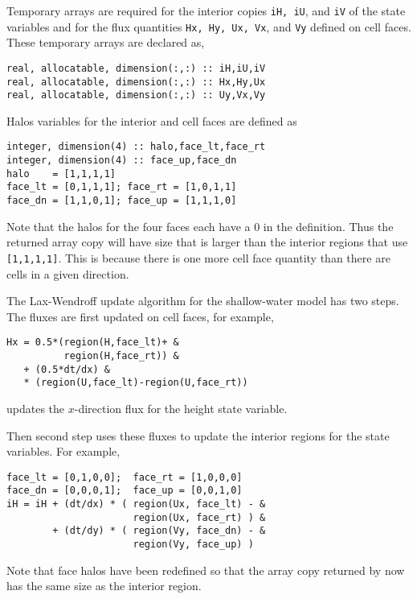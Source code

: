 Temporary arrays are required for the interior copies {\tt iH, iU}, and
{\tt iV} of the state variables and for the flux quantities {\tt Hx, Hy, Ux,
Vx}, and {\tt Vy} defined on cell faces.  These temporary arrays are declared as,

{\small
\begin{verbatim}
real, allocatable, dimension(:,:) :: iH,iU,iV
real, allocatable, dimension(:,:) :: Hx,Hy,Ux
real, allocatable, dimension(:,:) :: Uy,Vx,Vy
\end{verbatim}
}

Halos variables for the interior and cell faces are defined as

{\small
\begin{verbatim}
integer, dimension(4) :: halo,face_lt,face_rt
integer, dimension(4) :: face_up,face_dn
halo    = [1,1,1,1]
face_lt = [0,1,1,1]; face_rt = [1,0,1,1]
face_dn = [1,1,0,1]; face_up = [1,1,1,0]
\end{verbatim}
}

Note that the halos for the four faces each have a 0 in the
definition. Thus the returned array copy will have size that is larger
than the interior regions that use {\tt [1,1,1,1]}.  This is because
there is one more cell face quantity than there are cells in a given
direction.

The Lax-Wendroff update algorithm for the shallow-water model has
two steps.  The fluxes are first updated on cell faces, for
example,

{\small
\begin{verbatim}
Hx = 0.5*(region(H,face_lt)+ &
          region(H,face_rt)) &
   + (0.5*dt/dx) &
   * (region(U,face_lt)-region(U,face_rt))
\end{verbatim}
}

\noindent
updates the $x$-direction flux for the height state variable.

Then second step uses these fluxes to update the interior regions for
the state variables.  For example,

{\small
\begin{verbatim}
face_lt = [0,1,0,0];  face_rt = [1,0,0,0]
face_dn = [0,0,0,1];  face_up = [0,0,1,0]
iH = iH + (dt/dx) * ( region(Ux, face_lt) - &
                      region(Ux, face_rt) ) &
        + (dt/dy) * ( region(Vy, face_dn) - &
                      region(Vy, face_up) )
\end{verbatim}
}

\noindent
Note that face halos have been redefined so that the array copy
returned by now has the same size as the interior region.

